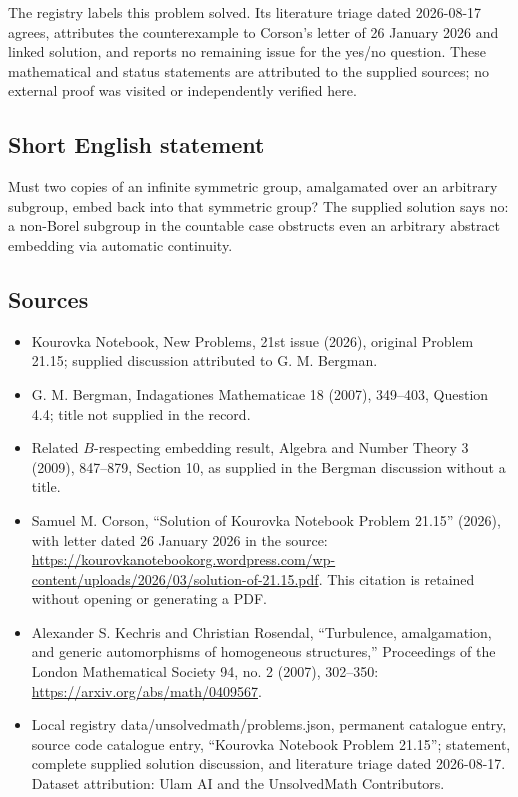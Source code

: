 \documentclass[11pt]{article}
\begin{document}
The registry labels this problem solved. Its literature triage dated 2026-08-17 agrees, attributes the counterexample to Corson's letter of 26 January 2026 and linked solution, and reports no remaining issue for the yes/no question. These mathematical and status statements are attributed to the supplied sources; no external proof was visited or independently verified here.
\subsection{Short English statement}
Must two copies of an infinite symmetric group, amalgamated over an arbitrary subgroup, embed back into that symmetric group? The supplied solution says no: a non-Borel subgroup in the countable case obstructs even an arbitrary abstract embedding via automatic continuity.
\subsection{Sources}
\begin{itemize}
\item Kourovka Notebook, New Problems, 21st issue (2026), original Problem 21.15; supplied discussion attributed to G. M. Bergman.
\item G. M. Bergman, Indagationes Mathematicae 18 (2007), 349--403, Question 4.4; title not supplied in the record.
\item Related $B$-respecting embedding result, Algebra and Number Theory 3 (2009), 847--879, Section 10, as supplied in the Bergman discussion without a title.
\item Samuel M. Corson, ``Solution of Kourovka Notebook Problem 21.15'' (2026), with letter dated 26 January 2026 in the source: \url{https://kourovkanotebookorg.wordpress.com/wp-content/uploads/2026/03/solution-of-21.15.pdf}. This citation is retained without opening or generating a PDF.
\item Alexander S. Kechris and Christian Rosendal, ``Turbulence, amalgamation, and generic automorphisms of homogeneous structures,'' Proceedings of the London Mathematical Society 94, no. 2 (2007), 302--350: \url{https://arxiv.org/abs/math/0409567}.
\item Local registry data/unsolvedmath/problems.json, permanent catalogue entry, source code catalogue entry, ``Kourovka Notebook Problem 21.15''; statement, complete supplied solution discussion, and literature triage dated 2026-08-17. Dataset attribution: Ulam AI and the UnsolvedMath Contributors.
\end{itemize}
\end{document}
